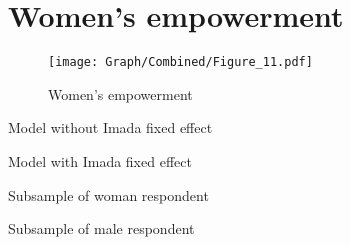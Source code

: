 \documentclass[10pt,a4paper]{article}
\begin{document}
\section{Women's empowerment}
\begin{table}[H]\centering

\end{table}
\begin{figure}[H]\centering
\texttt{[image: Graph/Combined/Figure\_11.pdf]}
\caption{Women's empowerment} \label{fig:Fig_11}
\end{figure}
\begin{table}[H]\centering\caption{Model without Imada fixed effect}

\end{table}
\begin{table}[H]\centering\caption{Model with Imada fixed effect}

\end{table}
\begin{table}[H]\centering\caption{Subsample of woman respondent}

\end{table}
\begin{table}[H]\centering\caption{Subsample of male respondent}

\end{table}
\pagebreak
\end{document}
